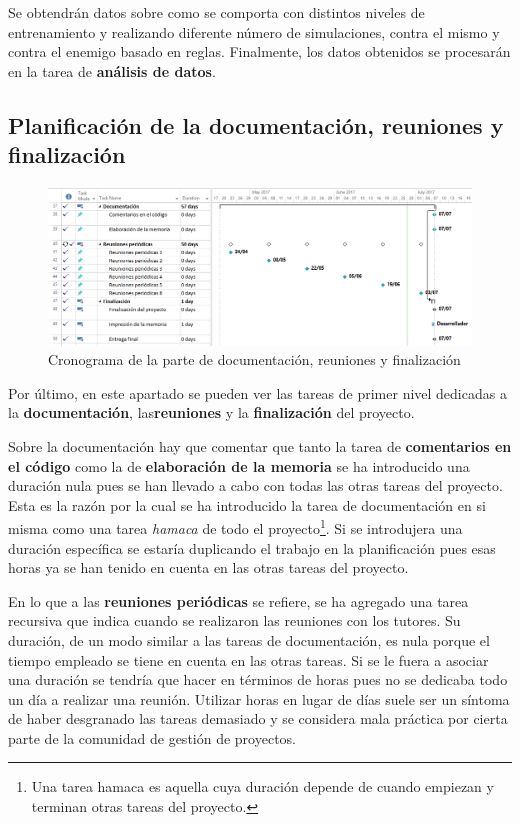 Se obtendrán datos sobre como se comporta con distintos niveles de entrenamiento y realizando diferente número de simulaciones, contra el mismo y contra el enemigo basado en reglas. Finalmente, los datos obtenidos se procesarán en la tarea de \textbf{análisis de datos}.


\subsection{Planificación de la documentación, reuniones y finalización}

\begin{figure}
	\centerline{\includegraphics[width=19cm]{otros/capturasPlanificacion/documentacion_reuniones_final.PNG}}
	\caption{Cronograma de la parte de documentación, reuniones y finalización}
	\label{plan:fin}
\end{figure}

Por último, en este apartado se pueden ver las tareas de primer nivel dedicadas a la \textbf{documentación}, las\textbf{reuniones} y la \textbf{finalización} del proyecto.

\bigskip

Sobre la documentación hay que comentar que tanto la tarea de \textbf{comentarios en el código} como la de \textbf{elaboración de la memoria} se ha introducido una duración nula pues se han llevado a cabo con todas las otras tareas del proyecto. Esta es la razón por la cual se ha introducido la tarea de documentación en si misma como una tarea \textit{hamaca} de todo el proyecto\footnote{Una tarea hamaca es aquella cuya duración depende de cuando empiezan y terminan otras tareas del proyecto.}. Si se introdujera una duración específica se estaría duplicando el trabajo en la planificación pues esas horas ya se han tenido en cuenta en las otras tareas del proyecto.

\bigskip

En lo que a las \textbf{reuniones periódicas} se refiere, se ha agregado una tarea recursiva que indica cuando se realizaron las reuniones con los tutores. Su duración, de un modo similar a las tareas de documentación, es nula porque el tiempo empleado se tiene en cuenta en las otras tareas. Si se le fuera a asociar una duración se tendría que hacer en términos de horas pues no se dedicaba todo un día a realizar una reunión. Utilizar horas en lugar de días suele ser un síntoma de haber desgranado las tareas demasiado y se considera mala práctica por cierta parte de la comunidad de gestión de proyectos.

